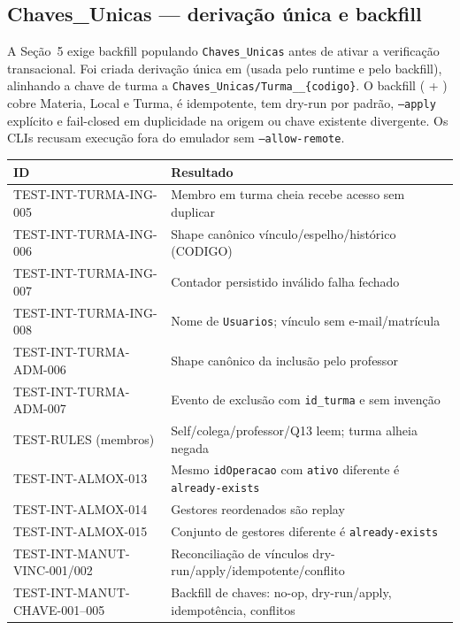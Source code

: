 \subsection{Chaves\_Unicas --- derivação única e backfill}

A Seção~5 exige backfill populando \texttt{Chaves\_Unicas} antes de ativar a
verificação transacional. Foi criada derivação única em
 (usada pelo runtime e pelo backfill), alinhando a
chave de turma a \texttt{Chaves\_Unicas/Turma\_\_\{codigo\}}. O backfill
( +
) cobre Materia, Local e
Turma, é idempotente, tem dry-run por padrão, \texttt{--apply} explícito e
fail-closed em duplicidade na origem ou chave existente divergente. Os CLIs
recusam execução fora do emulador sem \texttt{--allow-remote}.

\begin{longtable}{@{}p{}p{}@{}}
\toprule
ID & Resultado \\
\midrule
\endhead
TEST-INT-TURMA-ING-005 & Membro em turma cheia recebe acesso sem duplicar \\
TEST-INT-TURMA-ING-006 & Shape canônico vínculo/espelho/histórico (CODIGO) \\
TEST-INT-TURMA-ING-007 & Contador persistido inválido falha fechado \\
TEST-INT-TURMA-ING-008 & Nome de \texttt{Usuarios}; vínculo sem e-mail/matrícula \\
TEST-INT-TURMA-ADM-006 & Shape canônico da inclusão pelo professor \\
TEST-INT-TURMA-ADM-007 & Evento de exclusão com \texttt{id\_turma} e sem invenção \\
TEST-RULES (membros) & Self/colega/professor/Q13 leem; turma alheia negada \\
TEST-INT-ALMOX-013 & Mesmo \texttt{idOperacao} com \texttt{ativo} diferente é \texttt{already-exists} \\
TEST-INT-ALMOX-014 & Gestores reordenados são replay \\
TEST-INT-ALMOX-015 & Conjunto de gestores diferente é \texttt{already-exists} \\
TEST-INT-MANUT-VINC-001/002 & Reconciliação de vínculos dry-run/apply/idempotente/conflito \\
TEST-INT-MANUT-CHAVE-001--005 & Backfill de chaves: no-op, dry-run/apply, idempotência, conflitos \\
\bottomrule
\end{longtable}

